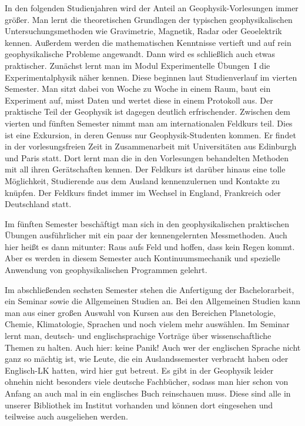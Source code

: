 \begin{multicols}{2}
In den folgenden Studienjahren wird der Anteil an Geophysik-Vorlesungen immer größer.
Man lernt die theoretischen Grundlagen der typischen geophysikalischen Untersuchungsmethoden wie Gravimetrie, Magnetik, Radar oder Geoelektrik kennen.
Außerdem werden die mathematischen Kenntnisse vertieft und auf rein geophysikalische Probleme angewandt.
Dann wird es schließlich auch etwas praktischer.
Zunächst lernt man im Modul Experimentelle Übungen~I die Experimentalphysik näher kennen.
Diese beginnen laut Studienverlauf im vierten Semester.
Man sitzt dabei von Woche zu Woche in einem Raum, baut ein Experiment auf, misst Daten und wertet diese in einem Protokoll aus.
Der praktische Teil der Geophysik ist dagegen deutlich erfrischender.
Zwischen dem vierten und fünften Semester nimmt man am internationalen Feldkurs teil.
Dies ist eine Exkursion, in deren Genuss nur Geophysik-Studenten kommen.
Er findet in der vorlesungsfreien Zeit in Zusammenarbeit mit Universitäten aus Edinburgh und Paris statt.
Dort lernt man die in den Vorlesungen behandelten Methoden mit all ihren Gerätschaften kennen.
Der Feldkurs ist darüber hinaus eine tolle Möglichkeit, Studierende aus dem Ausland kennenzulernen und Kontakte zu knüpfen.
Der Feldkurs findet immer im Wechsel in England, Frankreich oder Deutschland statt.

Im fünften Semester beschäftigt man sich in den geophysikalischen praktischen Übungen ausführlicher mit ein paar der kennengelernten Messmethoden.
Auch hier heißt es dann mitunter: Raus aufs Feld und hoffen, dass kein Regen kommt.
Aber es werden in diesem Semester auch Kontinuumsmechanik und spezielle Anwendung von geophysikalischen Programmen gelehrt.

Im abschließenden sechsten Semester stehen die Anfertigung der Bachelorarbeit, ein Seminar sowie die Allgemeinen Studien an. Bei den Allgemeinen Studien kann man aus einer großen Auswahl von Kursen aus den Bereichen Planetologie, Chemie, Klimatologie, Sprachen und noch vielem mehr auswählen. Im Seminar lernt man, deutsch- und englischsprachige Vorträge über wissenschaftliche Themen zu halten. Auch hier: keine Panik! Auch wer der englischen Sprache nicht ganz so mächtig ist, wie Leute, die ein Auslandssemester verbracht haben oder Englisch-LK hatten, wird hier gut betreut. Es gibt in der Geophysik leider ohnehin nicht besonders viele deutsche Fachbücher, sodass man hier schon von Anfang an auch mal in ein englisches Buch reinschauen muss. Diese sind alle in unserer Bibliothek im Institut vorhanden und können dort eingesehen und teilweise auch ausgeliehen werden.



\end{multicols}
